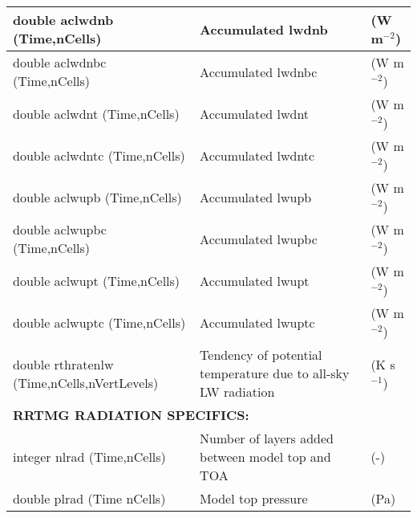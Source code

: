 {\begin{longtable}{|p{2.0in} |p{3.0in} |p{1.0in} |}
double aclwdnb (Time,nCells) & Accumulated lwdnb & (W m$^{-2}$) \\ \hline
double aclwdnbc (Time,nCells) & Accumulated lwdnbc & (W m$^{-2}$) \\ \hline
double aclwdnt (Time,nCells) & Accumulated lwdnt & (W m$^{-2}$) \\ \hline
double aclwdntc (Time,nCells) & Accumulated lwdntc & (W m$^{-2}$) \\ \hline
double aclwupb (Time,nCells) & Accumulated lwupb & (W m$^{-2}$) \\ \hline
double aclwupbc (Time,nCells) & Accumulated lwupbc & (W m$^{-2}$) \\ \hline
double aclwupt (Time,nCells) & Accumulated lwupt & (W m$^{-2}$) \\ \hline
double aclwuptc (Time,nCells) & Accumulated lwuptc & (W m$^{-2}$) \\ \hline
double rthratenlw \hfil\break (Time,nCells,nVertLevels)  & Tendency of potential temperature due to all-sky LW radiation & (K s$^{-1}$) \\ \hline

\multicolumn{3}{|l|}{{\rule[-3mm]{0mm}{8mm}\bf RRTMG RADIATION SPECIFICS:} \hfill}\\ \hline
integer nlrad (Time,nCells) & Number of layers added between model top and TOA & (-)  \\ \hline
double plrad (Time nCells) & Model top pressure & (Pa) \\ \hline


\end{longtable}}
